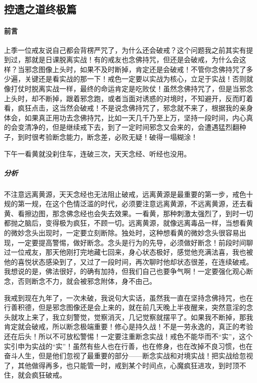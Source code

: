 \subsection{控遗之道终极篇}

\paragraph{前言}

上季一位戒友说自己都会背楞严咒了，为什么还会破戒？这个问题我之前其实有提到过，那就是日课脱离实战！有的戒友也念佛持咒，但还是会破戒，为什么会这样？当邪念图像上头时，如果不及时断掉，肯定还是会破戒！不管你念佛持咒了多少遍，关键还是看实战的那一下！戒色一定要以实战为核心，立足于实战！否则就像打仗时脱离实战一样，最终的命运肯定是吃败仗！虽然念佛持咒了，但是当邪念上头时，却不断掉，跟着邪念跑，或者当面对诱惑的对境时，不知避开，反而盯着看，疯狂点击，这当然会破戒！不是说念佛持咒了，邪念就不来了，根据我的亲身体会，如果真正用功去念佛持咒，比如一天几千乃至上万，坚持一段时间，内心真的会变清净的，但是继续戒下去，到了一定时间邪念又会来的，会遭遇猛烈翻种子，到时很考验断念能力，断念差，必败无疑！破得一塌糊涂！

\begin{case}
    下午一看黄就没刹住车，连破三次，天天念经、听经也没用。
    \subparagraph{分析} 不注意远离黄源，天天念经也无法阻止破戒，远离黄源是最重要的第一步，戒色十规的第一规，在这个色情泛滥的时代，必须要注意远离黄源，不远离黄源，还去看黄、看擦边图，那念佛念经也会失去效果。一看黄，那种刺激太强烈了，到时一切都抛之脑后，变得极为疯狂，不顾一切。远离黄源，就像远离毒品一样，当想看黄的微妙念头出现时，一定要立刻断除。独处时，这种想看黄的微妙念头很容易出现，一定要提高警惕，做好断念。念头是行为的先导，必须做好断念！前段时间聊过一位戒友，那天他刚打完地藏七回来，身心状态极好，感觉他充满法喜，我也被他的喜悦状态感染到了，又过了一段时间，再次聊时他却状态很差，在连续破戒。我想说的是，佛法很好，的确有加持，但我们自己也要争气啊！一定要强化观心断念，否则断念不力，就会被邪念附体，身不由己。
\end{case}

我戒到现在九年了，一次未破，我说句大实话，虽然我一直在坚持念佛持咒，也在行善积德，但是邪念图像还是会上来的，就在前几天晚上半夜醒来，突然意淫的念头就攻上来了，我立刻警觉，觉察消灭，几记觉察就摆平了。如果我不断掉，那我肯定就会破戒，所以断念极端重要！修心是持久战！不是一劳永逸的，真正的考验还在后头！所以不可放松警惕！一定要注重断念实战！戒色不能华而不“实”，这个实引申为实战的“实”！虽然有些人也在行善，也在修身，也在改掉不良习惯，也在奋斗人生，但是他们忽视了最重要的部分——断念实战和对境实战！把实战给忽视了，其他做得再多，也只能管一时，戒到某个时间点，心魔疯狂进攻，到时顶不住，就会疯狂破戒。


